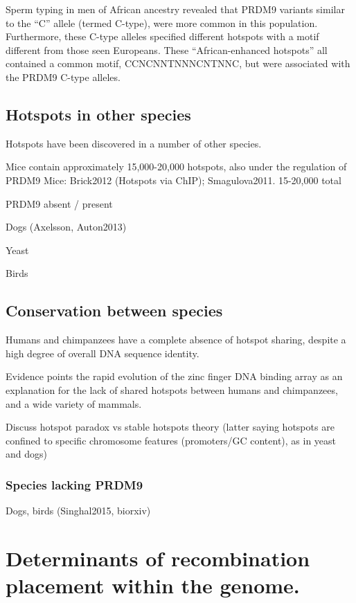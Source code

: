Sperm typing in men of African ancestry revealed that PRDM9 variants similar to the ``C'' allele (termed C-type), were more common in this population.
Furthermore, these C-type alleles specified different hotspots with a motif different from those seen Europeans\cite{Berg2011}. 
These ``African-enhanced hotspots'' all contained a common motif, CCNCNNTNNNCNTNNC, but were associated with the PRDM9 C-type alleles.




\subsection{Hotspots in other species}

Hotspots have been discovered in a number of other species.

Mice contain approximately 15,000-20,000 hotspots, also under the regulation of PRDM9
Mice: Brick2012 (Hotspots via ChIP); Smagulova2011. 15-20,000 total

PRDM9 absent / present

Dogs (Axelsson, Auton2013)

Yeast

Birds


\subsection{Conservation between species}

Humans and chimpanzees have a complete absence of hotspot sharing, despite a high degree of overall DNA sequence identity\cite{Ptak2005,Winckler2005,Auton2012a}.

Evidence points the rapid evolution of the zinc finger DNA binding array as an explanation for the lack of shared hotspots between humans and chimpanzees\cite{Myers2010}, and a wide variety of mammals\cite{Oliver2009,Ponting2011,Thomas2009}.

Discuss hotspot paradox vs stable hotspots theory (latter saying hotspots are confined to specific chromosome features (promoters/GC content), as in yeast and dogs)

\subsubsection{Species lacking PRDM9}
Dogs, birds (Singhal2015, biorxiv) 

\section{Determinants of recombination placement within the genome.}


